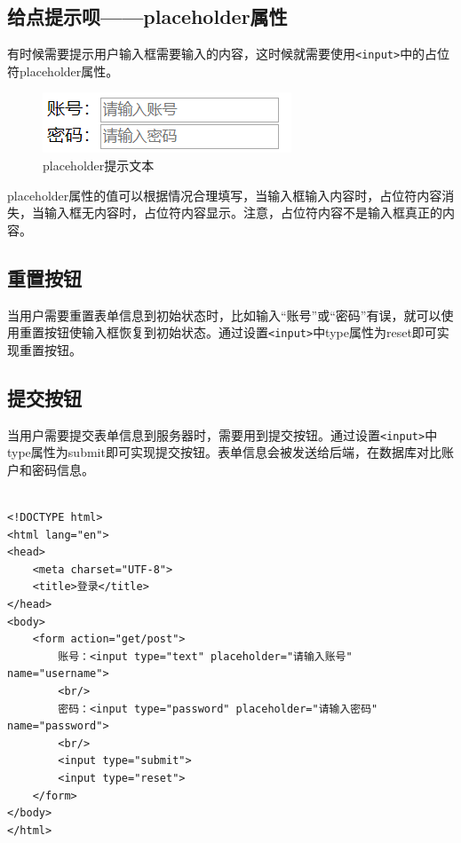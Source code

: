 \subsection{给点提示呗——placeholder属性}

有时候需要提示用户输入框需要输入的内容，这时候就需要使用\lstinline|<input>|中的占位符placeholder属性。

\begin{figure}[H]
    \centering
    \includegraphics[]{img/C4/4-3/1.png}
    \caption{placeholder提示文本}
\end{figure}

placeholder属性的值可以根据情况合理填写，当输入框输入内容时，占位符内容消失，当输入框无内容时，占位符内容显示。注意，占位符内容不是输入框真正的内容。

\subsection{重置按钮}

当用户需要重置表单信息到初始状态时，比如输入“账号”或“密码”有误，就可以使用重置按钮使输入框恢复到初始状态。通过设置\lstinline|<input>|中type属性为reset即可实现重置按钮。

\subsection{提交按钮}

当用户需要提交表单信息到服务器时，需要用到提交按钮。通过设置\lstinline|<input>|中type属性为submit即可实现提交按钮。表单信息会被发送给后端，在数据库对比账户和密码信息。 \\

 \\
\begin{lstlisting}[style=htmlcssjs]
<!DOCTYPE html>
<html lang="en">
<head>
    <meta charset="UTF-8">
    <title>登录</title>
</head>
<body>
    <form action="get/post">
        账号：<input type="text" placeholder="请输入账号" name="username">
        <br/>
        密码：<input type="password" placeholder="请输入密码" name="password">
        <br/>
        <input type="submit">
        <input type="reset">
    </form>
</body>
</html>
\end{lstlisting}

